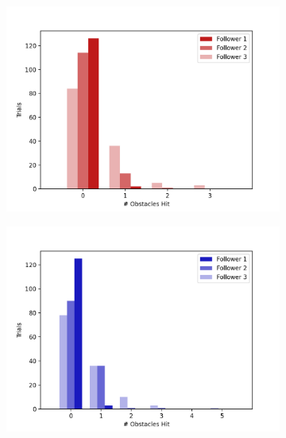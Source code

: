 \documentclass[12pt,twocolumn]{article}
\begin{document}
\begin{figure}
    \centering
    \begin{subfigure}{0.33\textwidth}
        \includegraphics[width=\linewidth]{Figs/StatisticalAnalysis/rigid_histogram.png}
        \caption{} \label{fig:rigidhistogram}
    \end{subfigure}%
    \begin{subfigure}{0.33\textwidth}
        \includegraphics[width=\linewidth]{Figs/StatisticalAnalysis/hard_histogram.png}
        \caption{} \label{fig:hardhistogram}
    \end{subfigure}%
    \begin{subfigure}{0.33\textwidth}

\end{subfigure}
\end{figure}
\end{document}
